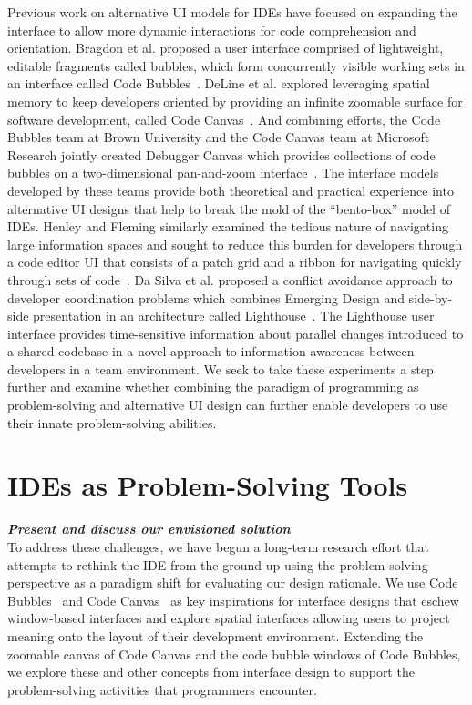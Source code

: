 \documentclass{ppig}
\newcommand{\bold}[1]{\textit{\textbf{\color{aoblue}#1}}} %
\begin{document}
Previous work on alternative UI models for IDEs have focused on expanding the interface to allow more dynamic interactions for code comprehension and orientation.
Bragdon et al. proposed a user interface comprised of lightweight, editable fragments called bubbles, which form concurrently visible working sets in an interface called Code Bubbles~\cite{bragdon2010bubbles}.
DeLine et al. explored leveraging spatial memory to keep developers oriented by providing an infinite zoomable surface for software development, called Code Canvas~\cite{deline2010canvas}.
And combining efforts, the Code Bubbles team at Brown University and the Code Canvas team at Microsoft Research jointly created Debugger Canvas which provides collections of code bubbles on a two-dimensional pan-and-zoom interface~\cite{deline2012debugger}.
The interface models developed by these teams provide both theoretical and practical experience into alternative UI designs that help to break the mold of the ``bento-box'' model of IDEs.
Henley and Fleming similarly examined the tedious nature of navigating large information spaces and sought to reduce this burden for developers through a code editor UI that consists of a patch grid and a ribbon for navigating quickly through sets of code~\cite{henley2014patchworks}.
Da Silva et al. proposed a conflict avoidance approach to developer coordination problems which combines Emerging Design and side-by-side presentation in an architecture called Lighthouse~\cite{dasilva2006lighthouse}.
The Lighthouse user interface provides time-sensitive information about parallel changes introduced to a shared codebase in a novel approach to information awareness between developers in a team environment.
We seek to take these experiments a step further and examine whether combining the paradigm of programming as problem-solving and alternative UI design can further enable developers to use their innate problem-solving abilities.

\section{IDEs as Problem-Solving Tools}
\bold{Present and discuss our envisioned solution\\}
To address these challenges, we have begun a long-term research effort that attempts to rethink the IDE from the ground up using the problem-solving perspective as a paradigm shift for evaluating our design rationale.
We use Code Bubbles~\cite{bragdon2010bubbles} and Code Canvas~\cite{deline2010canvas} as key inspirations for interface designs that eschew window-based interfaces and explore spatial interfaces allowing users to project meaning onto the layout of their development environment.
Extending the zoomable canvas of Code Canvas and the code bubble windows of Code Bubbles, we explore these and other concepts from interface design to support the problem-solving activities that programmers encounter.
\end{document}
